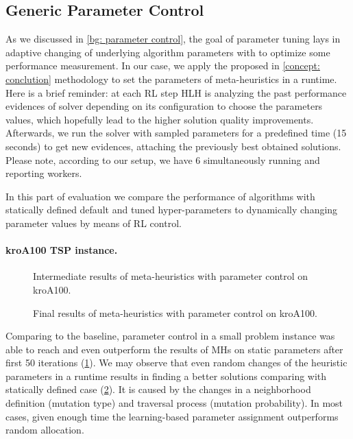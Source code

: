 \subsection{Generic Parameter Control}\label{eval:1:PC}
As we discussed in \cref{bg: parameter control}, the goal of parameter tuning lays in adaptive changing of underlying algorithm parameters with to optimize some performance measurement. In our case, we apply the proposed in \cref{concept: conclution} methodology to set the parameters of meta-heuristics in a runtime. Here is a brief reminder: at each RL step HLH is analyzing the past performance evidences of solver depending on its configuration to choose the parameters values, which hopefully lead to the higher solution quality improvements. Afterwards, we run the solver with sampled parameters for a predefined time (15 seconds) to get new evidences, attaching the previously best obtained solutions. Please note, according to our setup, we have 6 simultaneously running and reporting workers.

In this part of evaluation we compare the performance of algorithms with statically defined default and tuned hyper-parameters to dynamically changing parameter values by means of RL control.

\paragraph{kroA100 TSP instance.}
\begin{figure}[t]
	\centering
	\vspace{-20pt}
	
	\caption{Intermediate results of meta-heuristics with parameter control on kroA100.}
	\vspace{-5pt}
	\label{eval:pict:pc:kroA100 intermediate}
\end{figure}
\begin{figure}[b]
	\centering
	\vspace{-20pt}
	
	\caption{Final results of meta-heuristics with parameter control on kroA100.}
	\vspace{-5pt}
	\label{eval:pict:pc:kroA100 final}
\end{figure}

Comparing to the baseline, parameter control in a small problem instance was able to reach and even outperform the results of MHs on static parameters after first 50 iterations (\cref{eval:pict:pc:kroA100 intermediate}). We may observe that even random changes of the heuristic parameters in a runtime results in finding a better solutions comparing with statically defined case (\cref{eval:pict:pc:kroA100 final}). It is caused by the changes in a neighborhood definition (mutation type) and traversal process (mutation probability). In most cases, given enough time the learning-based parameter assignment outperforms random allocation.

